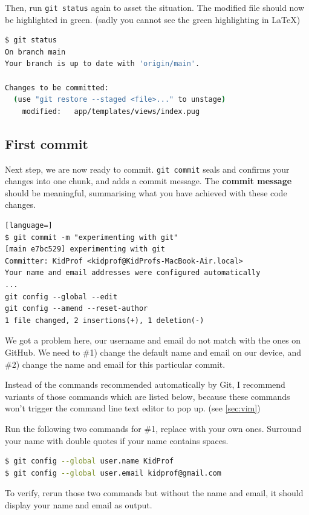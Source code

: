 Then, run \texttt{git status} again to asset the situation. The modified file should now be highlighted in green. (sadly you cannot see the green highlighting in LaTeX)

\begin{lstlisting}[language=bash]
$ git status
On branch main
Your branch is up to date with 'origin/main'.

Changes to be committed:
  (use "git restore --staged <file>..." to unstage)
	modified:   app/templates/views/index.pug
\end{lstlisting}

\subsection*{First commit}

Next step, we are now ready to commit. \texttt{git commit} seals and confirms your changes into one chunk, and adds a commit message. The \textbf{commit message} should be meaningful, summarising what you have achieved with these code changes.

\begin{lstlisting}[language=]
$ git commit -m "experimenting with git"
[main e7bc529] experimenting with git
Committer: KidProf <kidprof@KidProfs-MacBook-Air.local>
Your name and email addresses were configured automatically
...
git config --global --edit
git config --amend --reset-author
1 file changed, 2 insertions(+), 1 deletion(-)
\end{lstlisting}

We got a problem here, our username and email do not match with the ones on GitHub. We need to \#1) change the default name and email on our device, and \#2) change the name and email for this particular commit.

Instead of the commands recommended automatically by Git, I recommend variants of those commands which are listed below, because these commands won't trigger the command line text editor to pop up. (see \cref{sec:vim})

Run the following two commands for \#1, replace with your own ones. Surround your name with double quotes if your name contains spaces.

\begin{lstlisting}[language=bash]
$ git config --global user.name KidProf
$ git config --global user.email kidprof@gmail.com
\end{lstlisting}

To verify, rerun those two commands but without the name and email, it should display your name and email as output.

